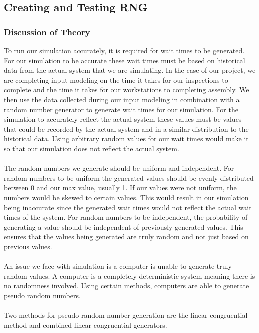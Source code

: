 \documentclass[final, hidelinks, 12pt, a4paper]{article}
\begin{document}
    \subsection{Creating and Testing RNG}
    \label{ssct:testRNG}
    \subsubsection{Discussion of Theory}
    \label{sssct:rngTh}
    To run our simulation accurately, it is required for wait times to be generated.
    For our simulation to be accurate these wait times must be based on historical data from the actual system that we are simulating.
    In the case of our project, we are completing input modeling on the time it takes for our inspections to complete and the time it takes for our workstations to completing assembly.
    We then use the data collected during our input modeling in combination with a random number generator to generate wait times for our simulation.
    For the simulation to accurately reflect the actual system these values must be values that could be recorded by the actual system and in a similar distribution to the historical data.
    Using arbitrary random values for our wait times would make it so that our simulation does not reflect the actual system.\\\\
The random numbers we generate should be uniform and independent. For random numbers to be uniform the generated values should be evenly distributed between 0 and our max value, usually 1.
    If our values were not uniform, the numbers would be skewed to certain values.
    This would result in our simulation being inaccurate since the generated wait times would not reflect the actual wait times of the system.
    For random numbers to be independent, the probability of generating a value should be independent of previously generated values.
    This ensures that the values being generated are truly random and not just based on previous values.\\\\
    An issue we face with simulation is a computer is unable to generate truly random values.
    A computer is a completely deterministic system meaning there is no randomness involved.
    Using certain methods, computers are able to generate pseudo random numbers.\\\\
    Two methods for pseudo random number generation are the linear congruential method and combined linear congruential generators.
\end{document}
